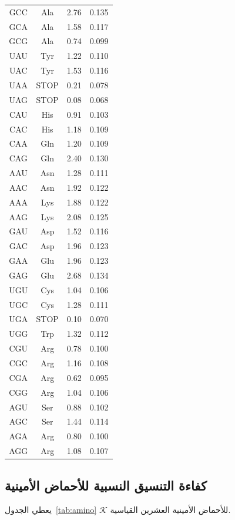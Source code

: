 \documentclass[11pt,a4paper]{article}
\newcommand{\REL}{\mathcal{K}}
\begin{document}
\begin{longtable}{|c|c|c|c|}
		GCC & Ala & 2.76 & 0.135 \\
		GCA & Ala & 1.58 & 0.117 \\
		GCG & Ala & 0.74 & 0.099 \\
		UAU & Tyr & 1.22 & 0.110 \\
		UAC & Tyr & 1.53 & 0.116 \\
		UAA & STOP & 0.21 & 0.078 \\
		UAG & STOP & 0.08 & 0.068 \\
		CAU & His & 0.91 & 0.103 \\
		CAC & His & 1.18 & 0.109 \\
		CAA & Gln & 1.20 & 0.109 \\
		CAG & Gln & 2.40 & 0.130 \\
		AAU & Asn & 1.28 & 0.111 \\
		AAC & Asn & 1.92 & 0.122 \\
		AAA & Lys & 1.88 & 0.122 \\
		AAG & Lys & 2.08 & 0.125 \\
		GAU & Asp & 1.52 & 0.116 \\
		GAC & Asp & 1.96 & 0.123 \\
		GAA & Glu & 1.96 & 0.123 \\
		GAG & Glu & 2.68 & 0.134 \\
		UGU & Cys & 1.04 & 0.106 \\
		UGC & Cys & 1.28 & 0.111 \\
		UGA & STOP & 0.10 & 0.070 \\
		UGG & Trp & 1.32 & 0.112 \\
		CGU & Arg & 0.78 & 0.100 \\
		CGC & Arg & 1.16 & 0.108 \\
		CGA & Arg & 0.62 & 0.095 \\
		CGG & Arg & 1.04 & 0.106 \\
		AGU & Ser & 0.88 & 0.102 \\
		AGC & Ser & 1.44 & 0.114 \\
		AGA & Arg & 0.80 & 0.100 \\
		AGG & Arg & 1.08 & 0.107 \\
		\hline
	\end{longtable}
	
	\subsection{كفاءة التنسيق النسبية للأحماض الأمينية}
	\label{sec:aminoacids}
	يعطي الجدول~\ref{tab:amino} \(\REL\) للأحماض الأمينية العشرين القياسية.
	
\end{document}
